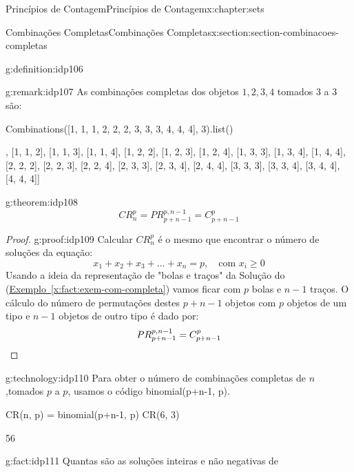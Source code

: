 \documentclass[oneside,10pt,]{book}
\newcommand{\xreffont}{\relax}
\newcommand{\qedhere}{\relax}
\numberwithin{equation}{section}
\begin{document}
\begin{chapterptx}{Princípios de Contagem}{}{Princípios de Contagem}{}{}{x:chapter:sets}
\begin{sectionptx}{Combinações Completas}{}{Combinações Completas}{}{}{x:section:section-combinacoes-completas}
\begin{definition}{}{g:definition:idp106}
%
\end{definition}
\begin{remark}{}{g:remark:idp107}%
As combinações completas dos objetos \(1, 2, 3, 4\) tomados 3 a 3 são: \begin{sageinput}
Combinations([1, 1, 1, 2, 2, 2, 3, 3, 3, 4, 4, 4], 3).list()
\end{sageinput}
\begin{sageoutput}
[[1, 1, 1],
 [1, 1, 2],
 [1, 1, 3],
 [1, 1, 4],
 [1, 2, 2],
 [1, 2, 3],
 [1, 2, 4],
 [1, 3, 3],
 [1, 3, 4],
 [1, 4, 4],
 [2, 2, 2],
 [2, 2, 3],
 [2, 2, 4],
 [2, 3, 3],
 [2, 3, 4],
 [2, 4, 4],
 [3, 3, 3],
 [3, 3, 4],
 [3, 4, 4],
 [4, 4, 4]]
\end{sageoutput}
\end{remark}
\begin{theorem}{}{}{g:theorem:idp108}%
%
\begin{equation*}
CR_n^p = PR_{p+n-1}^{p, n-1} = C_{p+n-1}^p
\end{equation*}
%
\end{theorem}
\begin{proof}{}{g:proof:idp109}
Calcular \(CR_n^p\) é o mesmo que encontrar o número de soluções da equação:%
\begin{equation*}
x_1 + x_2 + x_3 + \ldots + x_n  = p, ~~~ \text{ com }  x_i \geq 0 
\end{equation*}
Usando a ideia da representação de "bolas e traços" da Solução do (\hyperref[x:fact:exem-com-completa]{Exemplo~{\xreffont\ref{x:fact:exem-com-completa}}}) vamos ficar com \(p\) bolas e \(n-1\) traços. O cálculo do número de permutações destes \(p+n-1\) objetos com \(p\) objetos de um tipo e \(n-1\) objetos de outro tipo é dado por:%
\begin{equation*}
PR_{p+n-1}^{p, n-1} = C_{p+n-1}^p \qedhere
\end{equation*}
\end{proof}
\begin{technology}{}{g:technology:idp110}%
Para obter o número de combinações completas de \(n\),tomados \(p\) a \(p\), usamos o código binomial(p+n-1, p).%
\begin{sageinput}
CR(n, p) = binomial(p+n-1, p)
CR(6, 3)
\end{sageinput}
\begin{sageoutput}
56
\end{sageoutput}
\end{technology}
\begin{fact}{}{}{g:fact:idp111}%
Quantas são as soluções inteiras e não negativas de%

\end{fact}
\end{sectionptx}
\end{chapterptx}
\end{document}
